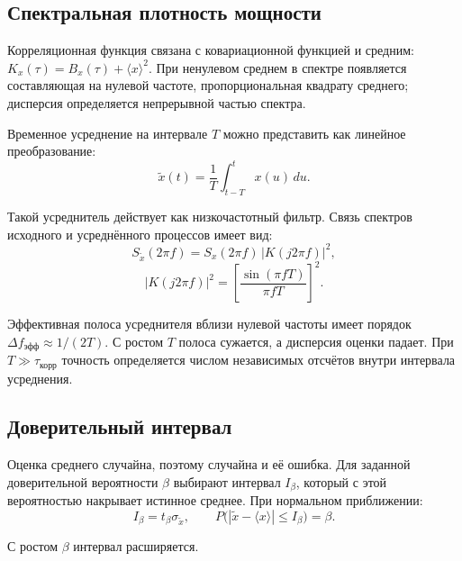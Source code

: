 \subsection{Спектральная плотность мощности}

Корреляционная функция связана с ковариационной функцией и средним: $K_x(\tau) = B_x(\tau) + \langle x \rangle^2$. При ненулевом среднем в спектре появляется составляющая на нулевой частоте, пропорциональная квадрату среднего; дисперсия определяется непрерывной частью спектра.

Временное усреднение на интервале $T$ можно представить как линейное преобразование:
\[
	\tilde{x}(t) = \frac{1}{T} \int_{t-T}^{t} x(u) \, du .
\]

Такой усреднитель действует как низкочастотный фильтр. Связь спектров исходного и усреднённого процессов имеет вид:
\[
	S_{\tilde{x}}(2\pi f) = S_x(2\pi f) \, |K(j2\pi f)|^2,
\]
\[
	|K(j2\pi f)|^2 = \left[ \frac{\sin(\pi f T)}{\pi f T} \right]^2 .
\]

Эффективная полоса усреднителя вблизи нулевой частоты имеет порядок $\Delta f_\text{эфф} \approx 1/(2T)$. С ростом $T$ полоса сужается, а дисперсия оценки падает. При $T \gg \tau_\text{корр}$ точность определяется числом независимых отсчётов внутри интервала усреднения.

\subsection{Доверительный интервал}

Оценка среднего случайна, поэтому случайна и её ошибка. Для заданной доверительной вероятности $\beta$ выбирают интервал $I_\beta$, который с этой вероятностью накрывает истинное среднее. При нормальном приближении:
\[
	I_\beta = t_\beta \sigma_{\tilde{x}}, \qquad P\big( |\tilde{x} - \langle x \rangle| \leqslant I_\beta \big) = \beta .
\]

С ростом $\beta$ интервал расширяется.
